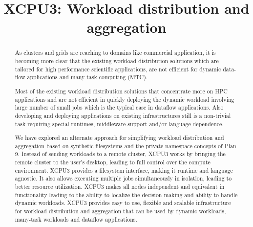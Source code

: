 \documentclass[conference]{IEEEtran}
\begin{document}
\title{XCPU3: Workload distribution and aggregation}


\author{
\and
{}
}

\maketitle

\begin{abstract}


As clusters and grids are reaching to domains like commercial application, it
is becoming more clear that the existing workload distribution solutions which
are tailored for high performance scientific applications, are not efficient
for dynamic data-flow applications and many-task computing (MTC).

Most of the existing workload distribution solutions that concentrate more on
HPC applications and are not efficient in quickly deploying the dynamic
workload involving large number of small jobs which is the typical case in
dataflow applications. Also developing and deploying applications on existing
infrastructures still is a non-trivial task requiring special runtimes,
middleware support and/or language dependence.

We have explored an alternate approach for simplifying workload
distribution and aggregation based on synthetic filesystems and the private
namespace concepts of Plan 9.  Instead of sending workloads to a remote
cluster, XCPU3 works by bringing the remote cluster to the user's desktop,
leading to full control over the compute environment.   XCPU3 provides
a filesystem interface, making it runtime and language agnostic.  It also
allows executing multiple jobs simultaneously in isolation, leading to
better resource utilization.  XCPU3 makes all nodes independent and
equivalent in functionality leading to the ability to localize the
decision making and ability to handle dynamic workloads.  XCPU3 provides easy to
use, flexible and scalable infrastructure for workload distribution and
aggregation that can be used by dynamic workloads, many-task workloads and
dataflow applications.

\end{abstract}
\end{document}
